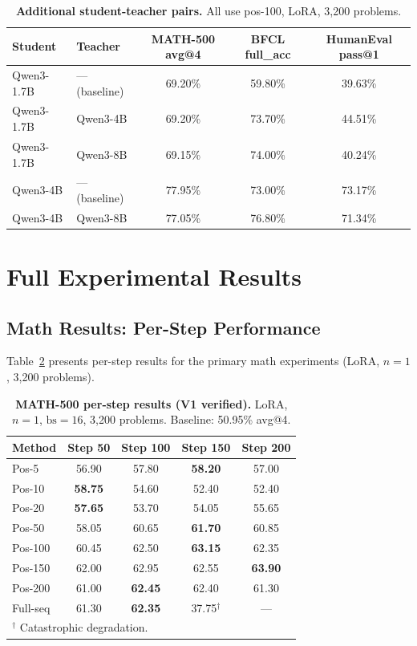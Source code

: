 \documentclass[10pt]{article}
\begin{document}
\begin{table}[!htbp]
\centering
\caption{\textbf{Additional student-teacher pairs.} All use pos-100, LoRA, 3,200 problems.}
\label{tab:additional_pairs}
\small
\begin{tabular}{llccc}
\toprule
\textbf{Student} & \textbf{Teacher} & \textbf{MATH-500 avg@4} & \textbf{BFCL full\_acc} & \textbf{HumanEval pass@1} \\
\midrule
Qwen3-1.7B & --- (baseline) & 69.20\% & 59.80\% & 39.63\% \\
Qwen3-1.7B & Qwen3-4B & 69.20\% & 73.70\% & 44.51\% \\
Qwen3-1.7B & Qwen3-8B & 69.15\% & 74.00\% & 40.24\% \\
\midrule
Qwen3-4B & --- (baseline) & 77.95\% & 73.00\% & 73.17\% \\
Qwen3-4B & Qwen3-8B & 77.05\% & 76.80\% & 71.34\% \\
\bottomrule
\end{tabular}
\end{table}


\section{Full Experimental Results}
\label{app:full_results}

\subsection{Math Results: Per-Step Performance}

Table~\ref{tab:app_math_main} presents per-step results for the primary math experiments (LoRA, $n{=}1$, 3,200 problems).

\begin{table}[!htbp]
\centering
\caption{\textbf{MATH-500 per-step results (V1 verified).} LoRA, $n{=}1$, $\text{bs}{=}16$, 3,200 problems. Baseline: 50.95\% avg@4.}
\label{tab:app_math_main}
\small
\begin{tabular}{l cccc}
\toprule
\textbf{Method} & \textbf{Step 50} & \textbf{Step 100} & \textbf{Step 150} & \textbf{Step 200} \\
\midrule
Pos-5 & 56.90 & 57.80 & \textbf{58.20} & 57.00 \\
Pos-10 & \textbf{58.75} & 54.60 & 52.40 & 52.40 \\
Pos-20 & \textbf{57.65} & 53.70 & 54.05 & 55.65 \\
Pos-50 & 58.05 & 60.65 & \textbf{61.70} & 60.85 \\
Pos-100 & 60.45 & 62.50 & \textbf{63.15} & 62.35 \\
Pos-150 & 62.00 & 62.95 & 62.55 & \textbf{63.90} \\
Pos-200 & 61.00 & \textbf{62.45} & 62.40 & 61.30 \\
Full-seq & 61.30 & \textbf{62.35} & 37.75$^\dag$ & --- \\
\bottomrule
\multicolumn{5}{l}{\footnotesize $^\dag$ Catastrophic degradation.}
\end{tabular}
\end{table}
\end{document}
